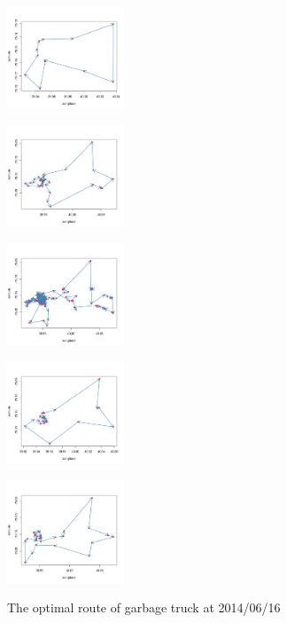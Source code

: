 \documentclass[conference]{IEEEtran}
\begin{document}
\begin{figure}
	\centering
	\begin{minipage}{3.5cm}
		\includegraphics[width=3.5cm]{Cluster1}
		\label{fig1a}
			\end{minipage}
	\begin{minipage}{3.5cm}
		\includegraphics[width=3.5cm]{Cluster2}
		\label{fig1b}
	\end{minipage}
	
		\begin{minipage}{3.5cm}
		\includegraphics[width=3.5cm]{Cluster3}
		\label{fig1a}
			\end{minipage}
	\begin{minipage}{3.5cm}
		\includegraphics[width=3.5cm]{Cluster4}
		\label{fig1b}
	\end{minipage}
	
	\begin{minipage}{3.5cm}
		\includegraphics[width=3.5cm]{Cluster5}
		
		\label{fig1b}
	\end{minipage}
	\caption{The optimal route of garbage truck at 2014/06/16}
	\label{fig5}
	
\end{figure}
\end{document}

